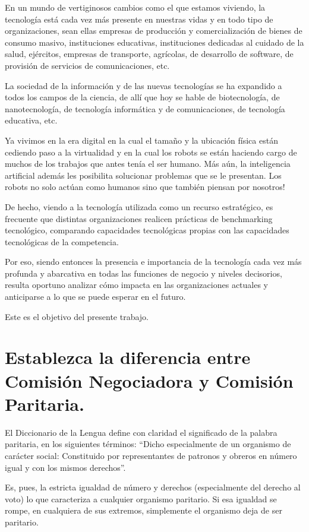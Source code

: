 \documentclass[a4paper, 12pt]{article}
\begin{document}
En un mundo de vertiginosos cambios como el que estamos viviendo, la tecnología está cada vez más presente en nuestras vidas y en todo tipo de organizaciones, sean ellas empresas de producción y comercialización de bienes de consumo masivo, instituciones educativas, instituciones dedicadas al cuidado de la salud, ejércitos, empresas de transporte, agrícolas, de desarrollo de software, de provisión de servicios de comunicaciones, etc.

La sociedad de la información y de las nuevas tecnologías se ha expandido a todos los campos de la ciencia, de allí que hoy se hable de biotecnología, de nanotecnología, de tecnología informática y de comunicaciones, de tecnología educativa, etc.

Ya vivimos en la era digital en la cual el tamaño y la ubicación física están cediendo paso a la virtualidad y en la cual los robots se están haciendo cargo de muchos de los trabajos que antes tenía el ser humano. Más aún, la inteligencia artificial además les posibilita solucionar problemas que se le presentan. Los robots no solo actúan como humanos sino que también piensan por nosotros!

De hecho, viendo a la tecnología utilizada como un recurso estratégico, es frecuente que distintas organizaciones realicen prácticas de benchmarking tecnológico, comparando capacidades tecnológicas propias con las capacidades tecnológicas de la competencia.

Por eso, siendo entonces la presencia e importancia de la tecnología cada vez más profunda y abarcativa en todas las funciones de negocio y niveles decisorios, resulta oportuno analizar cómo impacta en las organizaciones actuales y anticiparse a lo que se puede esperar en el futuro.

Este es el objetivo del presente trabajo.

\section{Establezca la diferencia entre Comisión Negociadora y Comisión Paritaria.}
\label{sec:DiferenciaComisiones}
El Diccionario de la Lengua define con claridad el significado de la palabra paritaria, en los siguientes términos: ``Dicho especialmente de un organismo de carácter social: Constituido por representantes de patronos y obreros en número igual y con los mismos derechos''.

Es, pues, la estricta igualdad de número y derechos (especialmente del derecho al voto) lo que caracteriza a cualquier organismo paritario. Si esa igualdad se rompe, en cualquiera de sus extremos, simplemente el organismo deja de ser paritario.
\end{document}
